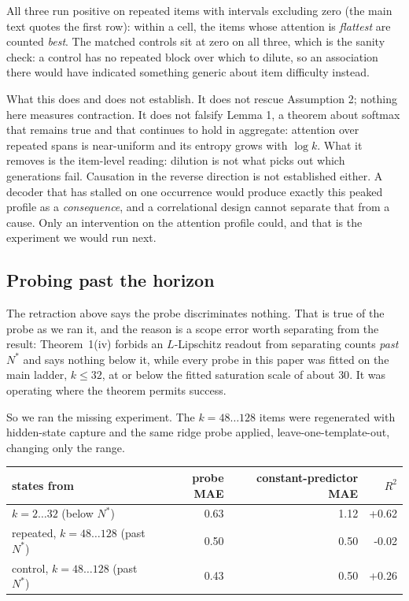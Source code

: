\documentclass[11pt]{article}
\begin{document}
All three run positive on repeated items with intervals excluding zero (the
main text quotes the first row): within a
cell, the items whose attention is \emph{flattest} are counted \emph{best}. The
matched controls sit at zero on all three, which is the sanity check: a
control has no repeated block over which to dilute, so an association there would
have indicated something generic about item difficulty instead.

What this does and does not establish. It does not rescue Assumption 2; nothing
here measures contraction. It does not falsify Lemma 1, a theorem about softmax
that remains true and that continues to hold in aggregate: attention over
repeated spans is near-uniform and its entropy grows with $\log k$. What it
removes is the item-level reading: dilution is not what picks out which
generations fail. Causation in the reverse direction is not established either. A
decoder that has stalled on one occurrence would produce exactly this peaked
profile as a \emph{consequence}, and a correlational design cannot separate that
from a cause. Only an intervention on the attention profile could, and that is
the experiment we would run next.


\subsection{Probing past the horizon}

The retraction above says the probe discriminates nothing. That is true of the
probe as we ran it, and the reason is a scope error worth separating from the
result: Theorem~1(iv) forbids an $L$-Lipschitz readout from separating counts
\emph{past} $N^\ast$ and says nothing below it, while every probe in this paper
was fitted on the main ladder, $k\le32$, at or below the fitted saturation scale
of about $30$. It was operating where the theorem permits success.

So we ran the missing experiment. The $k=48\ldots128$ items were regenerated with
hidden-state capture and the same ridge probe applied, leave-one-template-out,
changing only the range.

\begin{center}
\begin{tabular}{lrrr}
\toprule
states from & probe MAE & constant-predictor MAE & $R^2$ \\
\midrule
$k=2\ldots32$ (below $N^\ast$)   & 0.63 & 1.12 & +0.62 \\
repeated, $k=48\ldots128$ (past $N^\ast$)  & 0.50 & 0.50 & -0.02 \\
control, $k=48\ldots128$ (past $N^\ast$)   & 0.43 & 0.50 & +0.26 \\
\bottomrule
\end{tabular}
\end{center}
\end{document}
